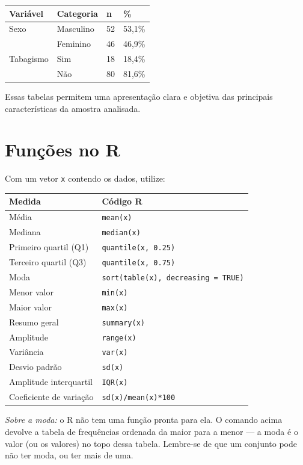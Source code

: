 \documentclass[
]{book}
\newcounter{none} %
\begin{document}
{\def\LTcaptype{none} %
\begin{longtable}[]{@{}llll@{}}
\toprule\noalign{}
Variável & Categoria & n & \% \\
\midrule\noalign{}
\endhead
\bottomrule\noalign{}
\endlastfoot
Sexo & Masculino & 52 & 53,1\% \\
& Feminino & 46 & 46,9\% \\
Tabagismo & Sim & 18 & 18,4\% \\
& Não & 80 & 81,6\% \\
\end{longtable}
}

Essas tabelas permitem uma apresentação clara e objetiva das principais características da amostra analisada.

\section{Funções no R}\label{funuxe7uxf5es-no-r}

Com um vetor \texttt{x} contendo os dados, utilize:

{\def\LTcaptype{none} %
\begin{longtable}[]{@{}ll@{}}
\toprule\noalign{}
Medida & Código R \\
\midrule\noalign{}
\endhead
\bottomrule\noalign{}
\endlastfoot
Média & \texttt{mean(x)} \\
Mediana & \texttt{median(x)} \\
Primeiro quartil (Q1) & \texttt{quantile(x,\ 0.25)} \\
Terceiro quartil (Q3) & \texttt{quantile(x,\ 0.75)} \\
Moda & \texttt{sort(table(x),\ decreasing\ =\ TRUE)} \\
Menor valor & \texttt{min(x)} \\
Maior valor & \texttt{max(x)} \\
Resumo geral & \texttt{summary(x)} \\
Amplitude & \texttt{range(x)} \\
Variância & \texttt{var(x)} \\
Desvio padrão & \texttt{sd(x)} \\
Amplitude interquartil & \texttt{IQR(x)} \\
Coeficiente de variação & \texttt{sd(x)/mean(x)*100} \\
\end{longtable}
}

\emph{Sobre a moda:} o R não tem uma função pronta para ela. O comando acima devolve a tabela de frequências ordenada da maior para a menor --- a moda é o valor (ou os valores) no topo dessa tabela. Lembre-se de que um conjunto pode não ter moda, ou ter mais de uma.
\end{document}
